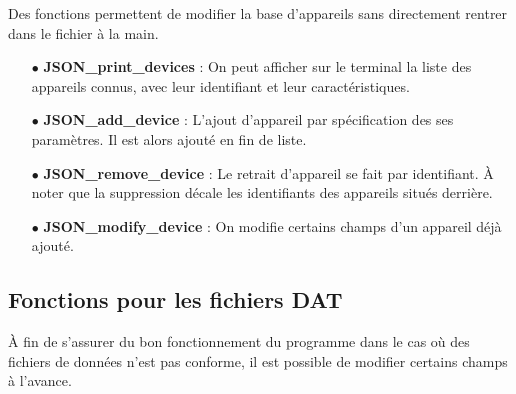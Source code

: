 \documentclass[12pt]{article}
\begin{document}
    Des fonctions permettent de modifier la base d'appareils sans directement rentrer dans le fichier à la main.
    
    \begin{enumerate}
        \item[$\bullet$] \textbf{JSON\_print\_devices} : On peut afficher sur le terminal la liste des appareils connus, avec leur identifiant et leur caractéristiques.
        \item[$\bullet$] \textbf{JSON\_add\_device} : L'ajout d'appareil par spécification des ses paramètres. Il est alors ajouté en fin de liste.
        \item[$\bullet$] \textbf{JSON\_remove\_device} : Le retrait d'appareil se fait par identifiant. À noter que la suppression décale les identifiants des appareils situés derrière.
        \item[$\bullet$] \textbf{JSON\_modify\_device} : On modifie certains champs d'un appareil déjà ajouté.
    \end{enumerate}

\subsection{Fonctions pour les fichiers DAT}

    À fin de s'assurer du bon fonctionnement du programme dans le cas où des fichiers de données n'est pas conforme, il est possible de modifier certains champs à l'avance.
\end{document}
